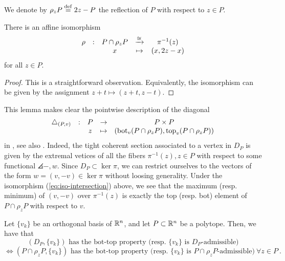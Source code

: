 We denote by $\rho_z P \stackrel{\mathrm{def}}{=} 2z-P$ the reflection of $P$ with respect to $z \in P$.

\begin{lemma}
	There is an affine isomorphism
	\begin{equation} \label{eq:iso-intersection}
		\begin{matrix}
			\rho & : & P\cap\rho_z P & \xrightarrow{\cong} & \pi^{-1}(z) \\
			& & x  & \mapsto & (x,2z-x)
		\end{matrix}
	\end{equation}
	for all $z \in P$.
\end{lemma}

\begin{proof}
	This is a straightforward observation.
	Equivalently, the isomorphism can be given by the assignment $z+t \mapsto (z+t,z-t)$.
\end{proof}

This lemma makes clear the pointwise description of the diagonal
\begin{equation*}
	\begin{matrix}
		\triangle_{(P,v)} & : & P & \to & P \times P \\
		& & z  & \mapsto & (\operatorname{bot}_v(P \cap \rho_z P),\operatorname{top}_v(P \cap \rho_z P))
	\end{matrix}
\end{equation*}
in \cite[Definition 10]{MTTV19}, see also \cite[Proposition 1.15]{GLA21}.
Indeed, the tight coherent section associated to a vertex in $D_P$ is given by the extremal vetices of all the fibers $\pi^{-1}(z), z \in P$ with respect to some functional $\angles{-,w}$.
Since $D_P \subset \ker \pi$, we can restrict ourselves to the vectors of the form $w=(v,-v) \in \ker \pi$ without loosing generality.
Under the isomorphism (\ref{eq:iso-intersection}) above, we see that the maximum (resp. minimum) of $(v,-v)$ over $\pi^{-1}(z)$ is exactly the top (resp. bot) element of $P\cap \rho_z P$ with respect to $v$.

\begin{lemma} \label{l:bot-top-for-DP}
	Let $\{v_k\}$ be an orthogonal basis of $\mathbb{R}^n$, and let $P\subset \mathbb{R}^n$ be a polytope.
	Then, we have that
	\[
	(D_P,\{v_k\}) \text{ has the bot-top property (resp. } \{v_k\} \text{ is }D_P\text{-admissible)}
	\]
	\[
	\iff (P\cap \rho_z P,\{v_k\}) \text{ has the bot-top property (resp. } \{v_k\} \text{ is }P\cap \rho_z P\text{-admissible)} \ \forall z \in P \ .
	\]
\end{lemma}

